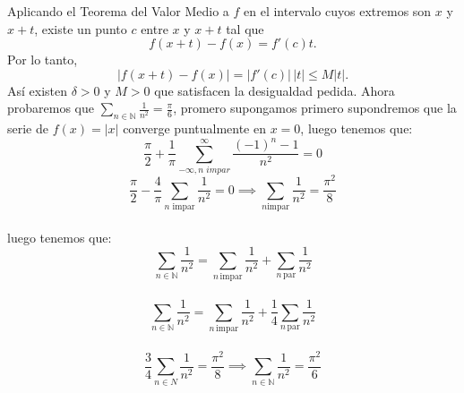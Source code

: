 \documentclass[11pt,letterpaper]{article}
\newcommand{\N}{\mathbb{N}}
\begin{document}
Aplicando el Teorema del Valor Medio a $f$ en el intervalo cuyos extremos son $x$ y $x+t$, existe un punto $c$ entre $x$ y $x+t$ tal que
\begin{equation*}
    f(x+t)-f(x)=f'(c)t.
\end{equation*}
Por lo tanto,
\begin{equation*}
    |f(x+t)-f(x)|=|f'(c)|\,|t|\leq M|t|.
\end{equation*}
Así existen $\delta>0$ y $M>0$ que satisfacen la desigualdad pedida.
Ahora probaremos que $\displaystyle \sum_{n\in \N}\frac{1}{n^2}=\frac{\pi}{6}$, promero supongamos 
primero supondremos que  la serie de $f(x)=|x|$ converge puntualmente en $x=0$, luego tenemos que:\,\\
\begin{equation*}
    \frac{\pi}{2}+\frac{1}{\pi}\sum_{-\infty, n\,\,impar}^{\infty}\frac{(-1)^n-1}{n^2}=0
\end{equation*} 
\begin{equation*}
    \frac{\pi}{2}-\frac{4}{\pi}\sum_{n\,\,\text{impar}}\frac{1}{n^2}=0\implies \sum_{n\text{impar}}\frac{1}{n^2}=\frac{\pi^2}{8}
\end{equation*}\,\\
luego tenemos que:\,\\
\begin{equation*}
    \sum_{n\in \N}\frac{1}{n^2}=\sum_{n\,\text{impar}}\frac{1}{n^2}+\sum_{n\,\text{par}}\frac{1}{n^2}
\end{equation*}\,\\
\begin{equation*}
     \sum_{n\in \N}\frac{1}{n^2}=\sum_{n\,\text{impar}}\frac{1}{n^2}+\frac{1}{4}\sum_{n\,\text{par}}\frac{1}{n^2}
\end{equation*}\,\\
\begin{equation*}
    \frac{3}{4}\sum_{n\in N}\frac{1}{n^2}=\frac{\pi^2}{8}\implies \sum_{n\in\N}\frac{1}{n^2}=\frac{\pi^2}{6}
\end{equation*}
\end{document}
